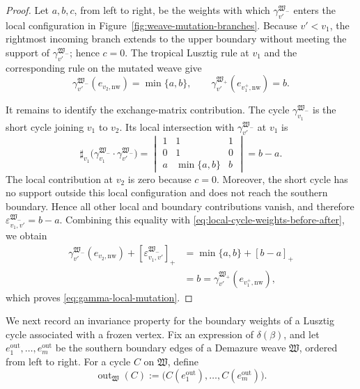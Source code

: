\documentclass[12pt, reqno]{amsart}
\theoremstyle{plain}
\theoremstyle{definition}
\numberwithin{equation}{section}
\begin{document}
\begin{proof}
Let \(a,b,c\), from left to right, be the weights with which
\(\gamma_{v'}^{\mathfrak W_-}\) enters the local configuration in Figure~\ref{fig:weave-mutation-branches}.
Because \(v'<v_1\), the rightmost incoming branch extends to the
upper boundary without meeting the support of
\(\gamma_{v'}^{\mathfrak W_-}\); hence \(c=0\). The tropical
Lusztig rule at \(v_1\) and the corresponding rule on the mutated
weave give
\begin{equation}\label{eq:local-cycle-weights-before-after}
    \gamma_{v'}^{\mathfrak W_-}
        (e_{v_2,\mathrm{nw}})=\min\{a,b\},
    \qquad
    \gamma_{v'}^{\mathfrak W_+}
        (e_{v_1^+,\mathrm{nw}})=b.
\end{equation}

It remains to identify the exchange-matrix contribution. The cycle
\(\gamma_{v_1}^{\mathfrak W_-}\) is the short cycle joining
\(v_1\) to \(v_2\). Its local intersection with
\(\gamma_{v'}^{\mathfrak W_-}\) at \(v_1\) is
\begin{equation}\label{eq:local-intersection-v1}
    \sharp_{v_1}
    \bigl(
        \gamma_{v_1}^{\mathfrak W_-}
        \mathbin{\cdot}
        \gamma_{v'}^{\mathfrak W_-}
    \bigr)
    =
    \begin{vmatrix}
        1&1&1\\
        0&1&0\\
        a&\min\{a,b\}&b
    \end{vmatrix}
    =b-a.
\end{equation}
The local contribution at \(v_2\) is zero because \(c=0\).
Moreover, the short cycle has no support outside this local
configuration and does not reach the southern boundary. Hence all
other local and boundary contributions vanish, and therefore
\(\varepsilon^{\mathfrak W_-}_{v_1,v'}=b-a\). Combining this
equality with
\eqref{eq:local-cycle-weights-before-after}, we obtain
\begin{align*}
    \gamma_{v'}^{\mathfrak W_-}
        (e_{v_2,\mathrm{nw}})
    +[\varepsilon^{\mathfrak W_-}_{v_1,v'}]_+
    &=\min\{a,b\}+[b-a]_+\\
    &=b
     =\gamma_{v'}^{\mathfrak W_+}
        (e_{v_1^+,\mathrm{nw}}),
\end{align*}
which proves \eqref{eq:gamma-local-mutation}.
\end{proof}

We next record an invariance property for the boundary weights of a
Lusztig cycle associated with a frozen vertex. Fix an expression of
\(\delta(\beta)\), and let
\(e_1^{\mathrm{out}},\ldots,e_m^{\mathrm{out}}\) be the southern
boundary edges of a Demazure weave \(\mathfrak W\), ordered from
left to right. For a cycle \(C\) on \(\mathfrak W\), define
\begin{equation}\label{eq:output-vector-cycle}
    \operatorname{out}_{\mathfrak W}(C)
    :=\bigl(C(e_1^{\mathrm{out}}),\ldots,
            C(e_m^{\mathrm{out}})\bigr).
\end{equation}
\end{document}
